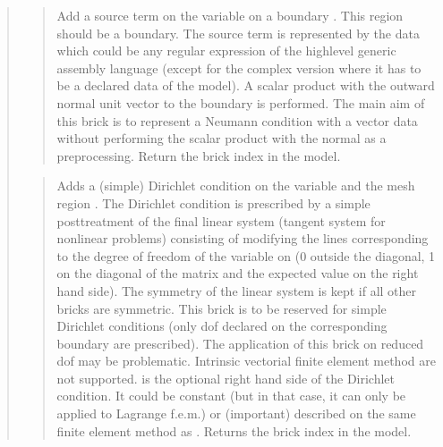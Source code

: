 \documentclass[a4paper,11pt,english]{sphinxmanual}
\begin{document}
\begin{quote}
\sphinxAtStartPar
{}
\begin{quote}

\sphinxAtStartPar
Add a source term on the variable  on a boundary .
This region should be a boundary. The source term is
represented by the data  which could be any regular
expression of the high\sphinxhyphen{}level generic assembly language (except
for the complex version where it has to be a declared data of
the model). A scalar
product with the outward normal unit vector to the boundary is performed.
The main aim of this brick is to represent a Neumann condition with a
vector data without performing the scalar product with the normal as a
pre\sphinxhyphen{}processing. Return the brick index in the model.
\end{quote}

\sphinxAtStartPar
{}
\begin{quote}

\sphinxAtStartPar
Adds a (simple) Dirichlet condition on the variable  and
the mesh region . The Dirichlet condition is prescribed by
a simple post\sphinxhyphen{}treatment of the final linear system (tangent system
for nonlinear problems) consisting of modifying the lines corresponding
to the degree of freedom of the variable on  (0 outside the
diagonal, 1 on the diagonal of the matrix and the expected value on
the right hand side).
The symmetry of the linear system is kept if all other bricks are
symmetric.
This brick is to be reserved for simple Dirichlet conditions (only dof
declared on the corresponding boundary are prescribed). The application
of this brick on reduced dof may be problematic. Intrinsic vectorial
finite element method are not supported.
 is the optional right hand side of  the Dirichlet condition.
It could be constant (but in that case, it can only be applied to
Lagrange f.e.m.) or (important) described on the same finite
element method as .
Returns the brick index in the model.
\end{quote}


\end{quote}
\end{document}
